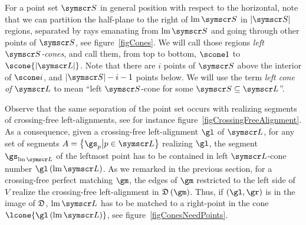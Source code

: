 For a point set $\pointset S$ in general position with respect to the horizontal,
note that we can partition the half-plane to the right of $\leftmost\pointset S$ in
$\Cardinality{\pointset S}$ regions,
separated by rays emanating from $\leftmost\pointset S$ and going through other points of
$\pointset S$, see figure~\ref{figCones}.
We will call those regions \emph{left $\pointset S$-cones}, and call them, from top to bottom, $\scone 1$ to
$\scone {\Cardinality{\pointset L}}$.
Note that there are $i$ points of $\pointset S$ above the interior of $\scone i$,
and $\Cardinality {\pointset S} - i - 1$ points below.
We will use the term \emph{left cone of $\pointset L$} to mean
``left $\pointset S$-cone for some $\pointset S\Subset\pointset L$''.

Observe that the same separation of the point set occurs with realizing segments of crossing-free left-alignments,
see for instance figure~\ref{figCrossingFreeAlignment}.
As a consequence, given a crossing-free left-alignment
$\gl$ of $\pointset L$, for any set of segments $A=\setst{\gs_p}{p\in\pointset L}$
realizing $\gl$, the segment $\gs_{\leftmost\pointset L}$ of the leftmost point has to be contained in left
$\pointset L$-cone number $\gl\of{\leftmost\pointset L}$.
As we remarked in the previous section, for a crossing-free perfect matching $\gm$, the edges of $\gm$ restricted
to the left side of $V$ realize the crossing-free
left-alignment in $\decomposition\of\gm$. Thus, if $\tuple{\gl, \gr}$ is in the image of
$\mathfrak{D}$, $\leftmost\pointset L$ has to be matched to a right-point in the cone
$\lcone{\gl\of{\leftmost\pointset L}}$, see figure~\ref{figConesNeedPoints}.

